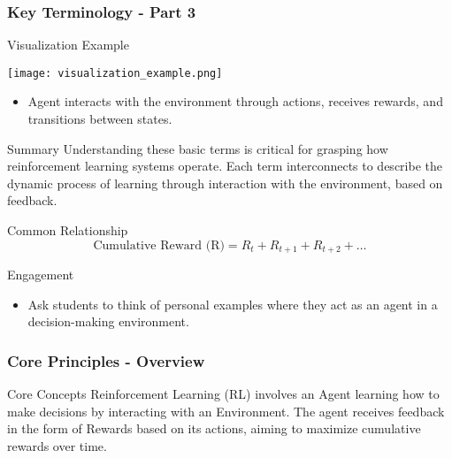 \documentclass[aspectratio=169]{beamer}
\begin{document}
\begin{frame}[fragile]
    \frametitle{Key Terminology - Part 3}
    
    \begin{block}{Visualization Example}
        \begin{center}
            \texttt{[image: visualization\_example.png]}
        \end{center}
        \begin{itemize}
            \item Agent interacts with the environment through actions, receives rewards, and transitions between states.
        \end{itemize}
    \end{block}

    \begin{block}{Summary}
        Understanding these basic terms is critical for grasping how reinforcement learning systems operate. 
        Each term interconnects to describe the dynamic process of learning through interaction with the environment, based on feedback.
    \end{block}

    \begin{block}{Common Relationship}
        \begin{equation}
            \text{Cumulative Reward (R)} = R_t + R_{t+1} + R_{t+2} + \ldots
        \end{equation}
    \end{block}

    \begin{block}{Engagement}
        \begin{itemize}
            \item Ask students to think of personal examples where they act as an agent in a decision-making environment.
        \end{itemize}
    \end{block}
\end{frame}

\begin{frame}[fragile]
    \frametitle{Core Principles - Overview}
    \begin{block}{Core Concepts}
        Reinforcement Learning (RL) involves an Agent learning how to make decisions by interacting with an Environment. 
        The agent receives feedback in the form of Rewards based on its actions, aiming to maximize cumulative rewards over time.
    \end{block}
\end{frame}
\end{document}
